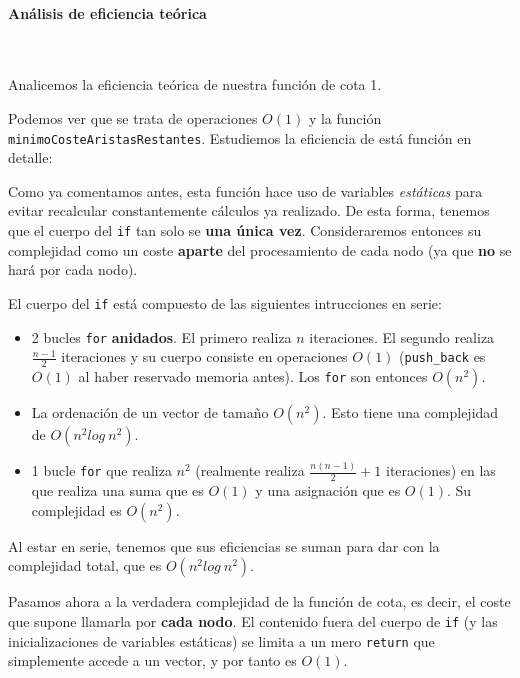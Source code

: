 \documentclass{article}
\newcommand{\myparagraph}[1]{\paragraph{#1}\mbox{}\\}
\begin{document}
\myparagraph{Análisis de eficiencia teórica} \label{subsubsec:ef_fcota1}

Analicemos la eficiencia teórica de nuestra función de cota 1.



Podemos ver que se trata de operaciones $O(1)$ y la función \verb|minimoCosteAristasRestantes|. Estudiemos la eficiencia de está función en detalle:



Como ya comentamos antes, esta función hace uso de variables \textit{estáticas} para evitar recalcular constantemente cálculos ya realizado. De esta forma, tenemos que el cuerpo del \texttt{if} tan solo se \textbf{una única vez}. Consideraremos entonces su complejidad como un coste \textbf{aparte} del procesamiento de cada nodo (ya que \textbf{no} se hará por cada nodo). 

El cuerpo del \texttt{if} está compuesto de las siguientes intrucciones en serie:
\begin{itemize}
    \item 
    2 bucles \texttt{for} \textbf{anidados}. El primero realiza $n$ iteraciones. El segundo realiza $\frac{n - 1}{2}$ iteraciones y su cuerpo consiste en operaciones $O(1)$ (\texttt{push_back} es $O(1)$ al haber reservado memoria antes). Los \texttt{for} son entonces $O(n^{2})$.
    \item La ordenación de un vector de tamaño $O(n^{2})$. Esto tiene una complejidad de $O(n^{2}log\:n^{2})$.
    \item 1 bucle \texttt{for} que realiza $n^{2}$ (realmente realiza $\frac{n(n-1)}{2} + 1$ iteraciones)
    en las que realiza una suma que es $O(1)$ y una asignación que es $O(1)$. Su complejidad es $O(n^{2})$.
\end{itemize}

Al estar en serie, tenemos que sus eficiencias se suman para dar con la complejidad total, que es $O(n^{2}log\:n^{2})$.

Pasamos ahora a la verdadera complejidad de la función de cota, es decir, el coste que supone llamarla por \textbf{cada nodo}. El contenido fuera del cuerpo de \texttt{if} (y las inicializaciones de variables estáticas) se limita a un mero \texttt{return} que simplemente accede a un vector, y por tanto es $O(1)$.
\end{document}
